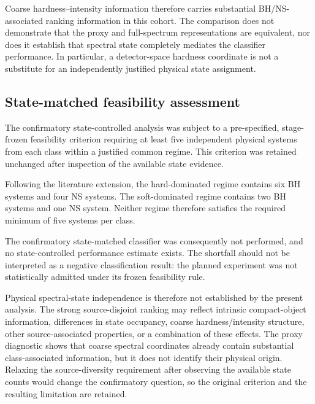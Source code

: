 \documentclass[final,5p,authoryear,nopreprintline]{elsarticle}
\begin{document}
Coarse hardness--intensity information therefore carries substantial BH/NS-associated ranking information in this cohort. The comparison does not demonstrate that the proxy and full-spectrum representations are equivalent, nor does it establish that spectral state completely mediates the classifier performance. In particular, a detector-space hardness coordinate is not a substitute for an independently justified physical state assignment.

\subsection{State-matched feasibility assessment}

The confirmatory state-controlled analysis was subject to a pre-specified, stage-frozen feasibility criterion requiring at least five independent physical systems from each class within a justified common regime. This criterion was retained unchanged after inspection of the available state evidence.

Following the literature extension, the hard-dominated regime contains six BH systems and four NS systems. The soft-dominated regime contains two BH systems and one NS system. Neither regime therefore satisfies the required minimum of five systems per class.

The confirmatory state-matched classifier was consequently not performed, and no state-controlled performance estimate exists. The shortfall should not be interpreted as a negative classification result: the planned experiment was not statistically admitted under its frozen feasibility rule.

Physical spectral-state independence is therefore not established by the present analysis. The strong source-disjoint ranking may reflect intrinsic compact-object information, differences in state occupancy, coarse hardness/intensity structure, other source-associated properties, or a combination of these effects. The proxy diagnostic shows that coarse spectral coordinates already contain substantial class-associated information, but it does not identify their physical origin. Relaxing the source-diversity requirement after observing the available state counts would change the confirmatory question, so the original criterion and the resulting limitation are retained.
\end{document}
